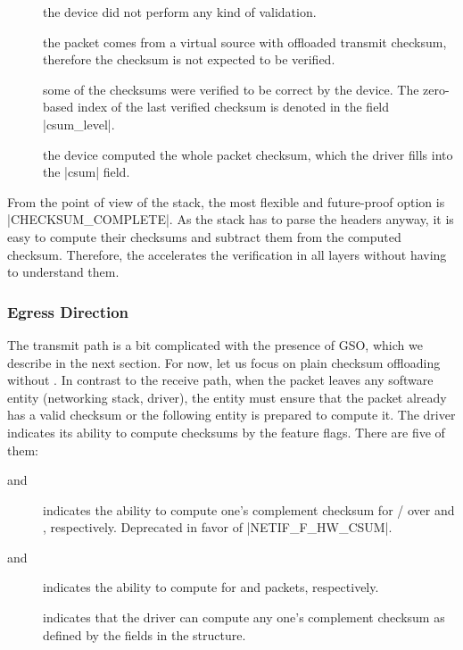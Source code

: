 \begin{description}
	\item[] the device did not perform any kind of
		validation.
	\item[] the packet comes from a virtual source
		with offloaded transmit checksum, therefore the checksum is not
		expected to be verified.
	\item[] some of the checksums were verified to
		be correct by the device. The zero-based index of the last verified
		checksum is denoted in the field \field|csum_level|.
	\item[] the device computed the whole packet
		checksum, which the driver fills into the \field|csum| field.
\end{description}

From the point of view of the stack, the most flexible and future-proof option
is \macro|CHECKSUM_COMPLETE|. As the stack has to parse the headers anyway, it
is easy to compute their checksums and subtract them from the computed
checksum. Therefore, the  accelerates the verification in all layers without
having to understand them.
\label{tag:linux-rxcsum}

\subsubsection{Egress Direction}

The transmit path is a bit complicated with the presence of \acrfull{GSO}, which we
describe in the next section. For now, let us focus on plain checksum
offloading without . In contrast to the receive path, when the packet
leaves any software entity (networking stack, driver), the entity must ensure
that the packet already has a valid checksum or the following entity is
prepared to compute it. The driver indicates its ability to compute checksums
by the feature flags. There are five of them:

\begin{description}
	\item[ and ]
		indicates the ability to compute one's complement checksum for
		/ over  and , respectively. Deprecated in
		favor of \macro|NETIF_F_HW_CSUM|.
	\item[ and ]
		indicates the ability to compute  for  and  packets,
		respectively.
	\item[]
		indicates that the driver can compute any one's complement checksum as
		defined by the fields in the \skb{} structure.
\end{description}

